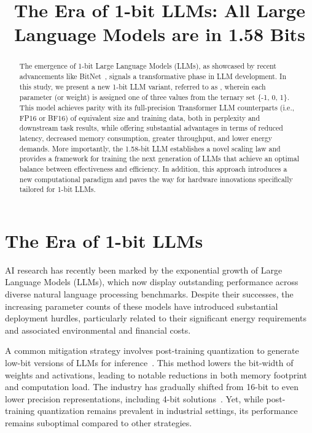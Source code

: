 \title{The Era of 1-bit LLMs: All Large Language Models are in 1.58 Bits}

\begin{abstract}
The emergence of 1-bit Large Language Models (LLMs), as showcased by recent advancements like BitNet~\cite{bitnet}, signals a transformative phase in LLM development. In this study, we present a new 1-bit LLM variant, referred to as \textbf{}, wherein each parameter (or weight) is assigned one of three values from the ternary set \{-1, 0, 1\}. This model achieves parity with its full-precision Transformer LLM counterparts (i.e., FP16 or BF16) of equivalent size and training data, both in perplexity and downstream task results, while offering substantial advantages in terms of reduced latency, decreased memory consumption, greater throughput, and lower energy demands. More importantly, the 1.58-bit LLM establishes a novel scaling law and provides a framework for training the next generation of LLMs that achieve an optimal balance between effectiveness and efficiency. In addition, this approach introduces a new computational paradigm and paves the way for hardware innovations specifically tailored for 1-bit LLMs.
\end{abstract}

\section{The Era of 1-bit LLMs}

AI research has recently been marked by the exponential growth of Large Language Models (LLMs), which now display outstanding performance across diverse natural language processing benchmarks. Despite their successes, the increasing parameter counts of these models have introduced substantial deployment hurdles, particularly related to their significant energy requirements and associated environmental and financial costs.

A common mitigation strategy involves post-training quantization to generate low-bit versions of LLMs for inference~\cite{smoothquant, gptq, quip, quip_sharp}. This method lowers the bit-width of weights and activations, leading to notable reductions in both memory footprint and computation load. The industry has gradually shifted from 16-bit to even lower precision representations, including 4-bit solutions~\cite{gptq, awq}. Yet, while post-training quantization remains prevalent in industrial settings, its performance remains suboptimal compared to other strategies.

